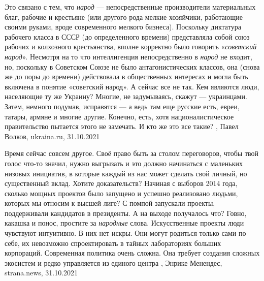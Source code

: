 Это связано с тем, что \emph{народ} — непосредственные производители материальных
благ, рабочие и крестьяне (или другого рода мелкие хозяйчики, работающие своими
руками, вроде современного мелкого бизнеса). Поскольку диктатура рабочего
класса в СССР (до определенного времени) представляла собой союз рабочих и
колхозного крестьянства, вполне корректно было говорить «\emph{советский народ}».
Несмотря на то что интеллигенция непосредственно в \emph{народ} не входит, но,
поскольку в Советском Союзе не было антагонистических классов, она (снова же до
поры до времени) действовала в общественных интересах и могла быть включена в
понятие «советский народ».  А сейчас все не так. Кем являются люди, населяющие
ту же Украину? Многие, не задумываясь, скажут — украинцами. Затем, немного
подумав, исправятся — а ведь там еще русские есть, евреи, татары, армяне и
многие другие. Конечно, есть, хотя националистическое правительство пытается
этого не замечать. И кто же это все такие?
, Павел Волков, ukraina.ru, 31.10.2021

Время сейчас совсем другое. Своё право быть за столом переговоров, чтобы твой
голос что-то значил, нужно выгрызать и это должно начинаться с маленьких
низовых инициатив, в которые каждый из нас может сделать свой личный, но
существенный вклад.  Хотите доказательств? Начиная с выборов 2014 года, сколько
мощных проектов было запущено и успешно реализовано людьми, которых мы относим
к высшей лиге? С помпой запускали проекты, поддерживали кандидатов в
президенты. А на выходе получалось что? Говно, какашка и понос, простите за
\emph{народные} слова.  Искусственные проекты люди чувствуют интуитивно. В них
нет искры. Они могут родиться только сами по себе, их невозможно спроектировать
в тайных лабораториях больших корпораций. Современная политика очень сложна.
Она требует создания сложных экосистем и редко управляется из единого центра
, 
Энрике Менендес, strana.news, 31.10.2021

